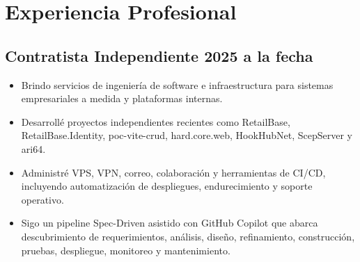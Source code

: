 \section*{Experiencia Profesional}

\subsection*{Contratista Independiente \hfill 2025 a la fecha}
\begin{itemize}[leftmargin=12pt]
    \item Brindo servicios de ingeniería de software e infraestructura para sistemas empresariales a medida y plataformas internas.
    \item Desarrollé proyectos independientes recientes como RetailBase, RetailBase.Identity, poc-vite-crud, hard.core.web, HookHubNet, ScepServer y ari64.
    \item Administré VPS, VPN, correo, colaboración y herramientas de CI/CD, incluyendo automatización de despliegues, endurecimiento y soporte operativo.
    \item Sigo un pipeline Spec-Driven asistido con GitHub Copilot que abarca descubrimiento de requerimientos, análisis, diseño, refinamiento, construcción, pruebas, despliegue, monitoreo y mantenimiento.
\end{itemize}

